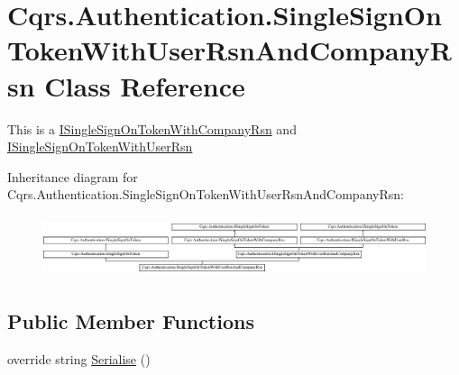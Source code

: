 \hypertarget{classCqrs_1_1Authentication_1_1SingleSignOnTokenWithUserRsnAndCompanyRsn}{}\section{Cqrs.\+Authentication.\+Single\+Sign\+On\+Token\+With\+User\+Rsn\+And\+Company\+Rsn Class Reference}
\label{classCqrs_1_1Authentication_1_1SingleSignOnTokenWithUserRsnAndCompanyRsn}


This is a \hyperlink{interfaceCqrs_1_1Authentication_1_1ISingleSignOnTokenWithCompanyRsn}{I\+Single\+Sign\+On\+Token\+With\+Company\+Rsn} and \hyperlink{interfaceCqrs_1_1Authentication_1_1ISingleSignOnTokenWithUserRsn}{I\+Single\+Sign\+On\+Token\+With\+User\+Rsn}  


Inheritance diagram for Cqrs.\+Authentication.\+Single\+Sign\+On\+Token\+With\+User\+Rsn\+And\+Company\+Rsn\+:\begin{figure}[H]
\begin{center}
\leavevmode
\includegraphics[height=1.794872cm]{classCqrs_1_1Authentication_1_1SingleSignOnTokenWithUserRsnAndCompanyRsn}
\end{center}
\end{figure}
\subsection*{Public Member Functions}
\begin{DoxyCompactItemize}
\item 
override string \hyperlink{classCqrs_1_1Authentication_1_1SingleSignOnTokenWithUserRsnAndCompanyRsn_a8d44249c00e5264dc7b37f4868836a80}{Serialise} ()
\end{DoxyCompactItemize}
